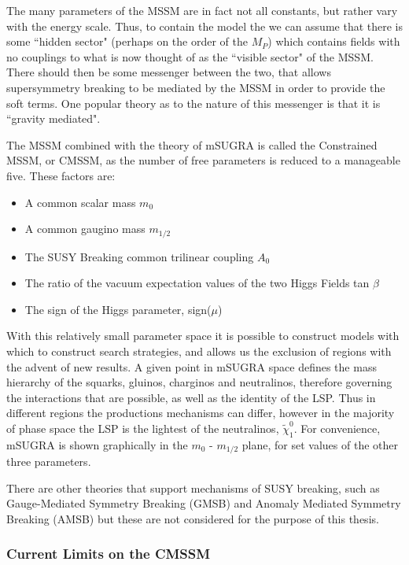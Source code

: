 The many parameters of the MSSM are in fact not all constants, but rather vary with the energy scale. Thus, to contain the model the we can assume that there is some ``hidden sector" (perhaps on the order of the $M_{P}$) which contains fields with no couplings to what is now thought of as the ``visible sector" of the MSSM. There should then be some messenger between the two, that allows supersymmetry breaking to be mediated by the MSSM in order to provide the soft terms. One popular theory as to the nature of this messenger is that it is ``gravity mediated". 

The MSSM combined with the theory of mSUGRA is called the Constrained MSSM, or CMSSM, as the number of free parameters is reduced to a manageable five. These factors are:

\begin{itemize}
\item{A common scalar mass $m_{0}$}
\item{A common gaugino mass $m_{1/2}$}
\item{The SUSY Breaking common trilinear coupling $A_{0}$}
\item{The ratio of the vacuum expectation values of the two Higgs Fields tan $\beta$}
\item{ The sign of the Higgs parameter, sign($\mu$)}
\end{itemize} 

With this relatively small parameter space it is possible to construct models with which to construct search strategies, and allows us the exclusion of regions with the advent of new results. A given point in mSUGRA space defines the mass hierarchy of the squarks, gluinos, charginos and neutralinos, therefore governing the interactions that are possible, as well as the identity of the LSP. Thus in different regions the productions mechanisms can differ, however in the majority of phase space the LSP is the lightest of the neutralinos, $\tilde{\chi}^{0}_{1}$.  For convenience, mSUGRA is shown graphically in the $m_{0}$ - $m_{1/2}$ plane, for set values of the other three parameters. 

There are other theories that support mechanisms of SUSY breaking, such as Gauge-Mediated Symmetry Breaking (GMSB) and Anomaly Mediated Symmetry Breaking (AMSB) but these are not considered for the purpose of this thesis. 

\subsubsection{Current Limits on the CMSSM}

